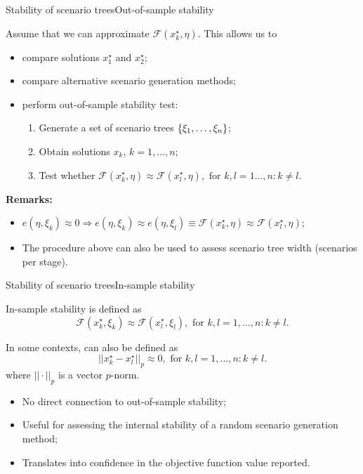 \begin{frame}{Stability of scenario trees}{Out-of-sample stability} 

	Assume that we can \alert{approximate} $\mathcal{F}(x_k^\star, \eta)$. This allows us to
	\vspace{-6pt}
	\begin{itemize}
		\item compare solutions $x_{1}^\star$ and $x_{2}^\star$;
		\item compare \alert{alternative} scenario generation methods;
		\item perform \alert{out-of-sample} stability test:
		\begin{enumerate}
			\item Generate a set of scenario trees $\left\{ \xi_1, \dots, \xi_n \right \}$;
			\item Obtain solutions $x_k$, $k=1,\dots,n$;	
			\item Test whether $\mathcal{F}(x_k^\star, \eta) \approx \mathcal{F}(x_l^\star, \eta), \text{ for } k,l = 1\dots, n : k \neq l$.
		\end{enumerate}
	\end{itemize}
	
	\pause
	{\bf Remarks:}
	\vspace{-6pt}
	\begin{itemize}
		\item $e(\eta, \xi_k) \approx 0 \Rightarrow e(\eta, \xi_k) \approx e(\eta, \xi_l) \equiv \mathcal{F}(x_k^\star,\eta) \approx \mathcal{F}(x_l^\star,\eta)$;
		\item The procedure above can also be used to \alert{assess scenario tree} width (scenarios per stage).
	\end{itemize}
	
\end{frame}



\begin{frame}{Stability of scenario trees}{In-sample stability}

	\alert{In-sample} stability is defined as
	$$
		\mathcal{F}(x_k^\star, \xi_k) \approx \mathcal{F}(x_l^\star, \xi_l), \text{ for } k,l = 1,\dots, n : k \neq l.
	$$
	
	\pause
	In some contexts, can also be defined as
	$$
		||x_k^\star - x_l^\star||_p \approx 0, \text{ for } k,l = 1,\dots, n : k \neq l.
	$$
	where $|| \cdot ||_p$ is a vector $p$-norm.
	
	\pause
	\begin{itemize}
		\item No direct connection to \alert{out-of-sample} stability;
		\item Useful for assessing the \alert{internal} stability of a random scenario generation method;
		\item Translates into \alert{confidence} in the objective function value reported.
	\end{itemize}
	
\end{frame}

